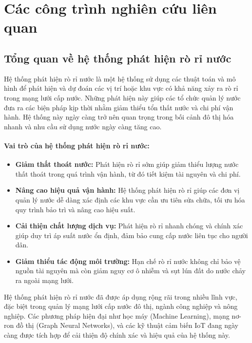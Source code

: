 \chapter{Các công trình nghiên cứu liên quan}

\section{Tổng quan về hệ thống phát hiện rò rỉ nước}

Hệ thống phát hiện rò rỉ nước là một hệ thống sử dụng các thuật toán và mô hình để phát hiện và dự đoán các vị trí hoặc khu vực có khả năng xảy ra rò rỉ trong mạng lưới cấp nước. Những phát hiện này giúp các tổ chức quản lý nước đưa ra các biện pháp kịp thời nhằm giảm thiểu tổn thất nước và chi phí vận hành. Hệ thống này ngày càng trở nên quan trọng trong bối cảnh đô thị hóa nhanh và nhu cầu sử dụng nước ngày càng tăng cao.

\subsubsection{Vai trò của hệ thống phát hiện rò rỉ nước:}
\begin{itemize}
    \item \textbf{Giảm thất thoát nước:} Phát hiện rò rỉ sớm giúp giảm thiểu lượng nước thất thoát trong quá trình vận hành, từ đó tiết kiệm tài nguyên và chi phí.
    \item \textbf{Nâng cao hiệu quả vận hành:} Hệ thống phát hiện rò rỉ giúp các đơn vị quản lý nước dễ dàng xác định các khu vực cần ưu tiên sửa chữa, tối ưu hóa quy trình bảo trì và nâng cao hiệu suất.
    \item \textbf{Cải thiện chất lượng dịch vụ:} Phát hiện rò rỉ nhanh chóng và chính xác giúp duy trì áp suất nước ổn định, đảm bảo cung cấp nước liên tục cho người dân.
    \item \textbf{Giảm thiểu tác động môi trường:} Hạn chế rò rỉ nước không chỉ bảo vệ nguồn tài nguyên mà còn giảm nguy cơ ô nhiễm và sụt lún đất do nước chảy ra ngoài mạng lưới.
\end{itemize}

Hệ thống phát hiện rò rỉ nước đã được áp dụng rộng rãi trong nhiều lĩnh vực, đặc biệt trong quản lý mạng lưới cấp nước đô thị, ngành công nghiệp và nông nghiệp. Các phương pháp hiện đại như học máy (Machine Learning), mạng nơ-ron đồ thị (Graph Neural Networks), và các kỹ thuật cảm biến IoT đang ngày càng được tích hợp để cải thiện độ chính xác và hiệu quả của hệ thống này.


